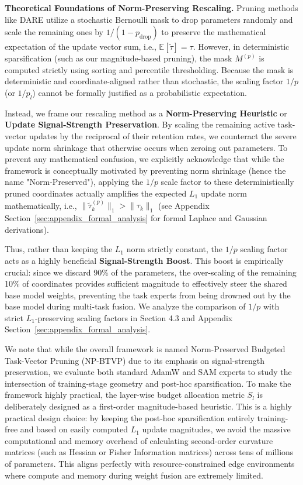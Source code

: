 \textbf{Theoretical Foundations of Norm-Preserving Rescaling.} 
Pruning methods like DARE \cite{yu2023language} utilize a stochastic Bernoulli mask to drop parameters randomly and scale the remaining ones by $1/(1-p_{\text{drop}})$ to preserve the mathematical expectation of the update vector sum, i.e., $\mathbb{E}[\tilde{\tau}] = \tau$. However, in deterministic sparsification (such as our magnitude-based pruning), the mask $M^{(p)}$ is computed strictly using sorting and percentile thresholding. Because the mask is deterministic and coordinate-aligned rather than stochastic, the scaling factor $1/p$ (or $1/p_l$) cannot be formally justified as a probabilistic expectation.

Instead, we frame our rescaling method as a \textbf{Norm-Preserving Heuristic} or \textbf{Update Signal-Strength Preservation}. By scaling the remaining active task-vector updates by the reciprocal of their retention rates, we counteract the severe update norm shrinkage that otherwise occurs when zeroing out parameters. To prevent any mathematical confusion, we explicitly acknowledge that while the framework is conceptually motivated by preventing norm shrinkage (hence the name "Norm-Preserved"), applying the $1/p$ scale factor to these deterministically pruned coordinates actually amplifies the expected $L_1$ update norm mathematically, i.e., $\|\tilde{\tau}_k^{(p)}\|_1 > \|\tau_k\|_1$ (see Appendix Section~\ref{sec:appendix_formal_analysis} for formal Laplace and Gaussian derivations). 

Thus, rather than keeping the $L_1$ norm strictly constant, the $1/p$ scaling factor acts as a highly beneficial \textbf{Signal-Strength Boost}. This boost is empirically crucial: since we discard 90\% of the parameters, the over-scaling of the remaining 10\% of coordinates provides sufficient magnitude to effectively steer the shared base model weights, preventing the task experts from being drowned out by the base model during multi-task fusion. We analyze the comparison of $1/p$ with strict $L_1$-preserving scaling factors in Section 4.3 and Appendix Section~\ref{sec:appendix_formal_analysis}.

We note that while the overall framework is named Norm-Preserved Budgeted Task-Vector Pruning (NP-BTVP) due to its emphasis on signal-strength preservation, we evaluate both standard AdamW and SAM experts to study the intersection of training-stage geometry and post-hoc sparsification. To make the framework highly practical, the layer-wise budget allocation metric $S_l$ is deliberately designed as a first-order magnitude-based heuristic. This is a highly practical design choice: by keeping the post-hoc sparsification entirely training-free and based on easily computed $L_1$ update magnitudes, we avoid the massive computational and memory overhead of calculating second-order curvature matrices (such as Hessian or Fisher Information matrices) across tens of millions of parameters. This aligns perfectly with resource-constrained edge environments where compute and memory during weight fusion are extremely limited.


